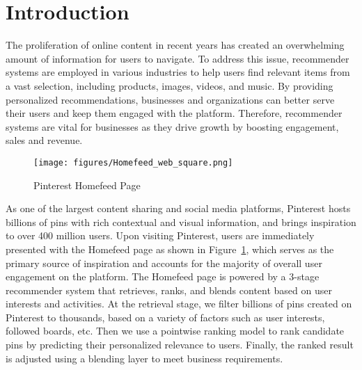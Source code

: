 \section{Introduction}

The proliferation of online content in recent years has created an overwhelming amount of information for users to navigate. 
To address this issue, recommender systems are employed  in various industries to help users find relevant items from a vast selection, including products, images, videos, and music. 
By providing personalized recommendations, businesses and organizations can better serve their users and keep them engaged with the platform. 
Therefore, recommender systems are vital for businesses as they drive growth by boosting engagement, sales and revenue.

\begin{figure}[!ht]
  \centering
  \texttt{[image: figures/Homefeed\_web\_square.png]}
  \caption{Pinterest Homefeed Page}
  \label{fig:hf}
\end{figure}

As one of the largest content sharing and social media platforms, Pinterest hosts billions of pins with rich contextual and visual information, and brings inspiration to over 400 million users. 
Upon visiting Pinterest, users are immediately presented with the Homefeed page as shown in Figure~\ref{fig:hf}, which serves as the primary source of inspiration and accounts for the majority of overall user engagement on the platform.
The Homefeed page is powered by a 3-stage recommender system that retrieves, ranks, and blends content based on user interests and activities. 
At the retrieval stage, we filter billions of pins created on Pinterest to thousands, based on a variety of factors such as user interests, followed boards, etc. Then we use a pointwise ranking model to rank candidate pins by predicting their personalized relevance to users. 
Finally, the ranked result is adjusted using a blending layer to meet business requirements.




